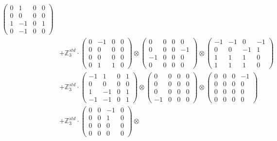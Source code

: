 \documentclass{article}
\begin{document}
{\begin{align}
            \begin{pmatrix} 0 & 1 & 0 & 0 \\ 0 & 0 & 0 & 0 \\ 1 & -1 & 0 & 1 \\ 0 & -1 & 0 & 0 \end{pmatrix} \\ 
        &+ \label{Rs16-Rc11-Solution-4-c25} \mathbb{Z}_3^{std} \cdot 
            \begin{pmatrix} 0 & -1 & 0 & 0 \\ 0 & 0 & 0 & 0 \\ 0 & 0 & 0 & 0 \\ 0 & 1 & 1 & 0 \end{pmatrix} \otimes 
            \begin{pmatrix} 0 & 0 & 0 & 0 \\ 0 & 0 & 0 & -1 \\ -1 & 0 & 0 & 0 \\ 0 & 0 & 0 & 0 \end{pmatrix} \otimes 
            \begin{pmatrix} -1 & -1 & 0 & -1 \\ 0 & 0 & -1 & 1 \\ 1 & 1 & 1 & 0 \\ 1 & 1 & 1 & 0 \end{pmatrix} \\ 
        &+ \label{Rs16-Rc11-Solution-4-c26} \mathbb{Z}_3^{std} \cdot 
            \begin{pmatrix} -1 & 1 & 0 & 1 \\ 0 & 0 & 0 & 0 \\ 1 & -1 & 0 & 1 \\ -1 & -1 & 0 & 1 \end{pmatrix} \otimes 
            \begin{pmatrix} 0 & 0 & 0 & 0 \\ 0 & 0 & 0 & 0 \\ 0 & 0 & 0 & 0 \\ -1 & 0 & 0 & 0 \end{pmatrix} \otimes 
            \begin{pmatrix} 0 & 0 & 0 & -1 \\ 0 & 0 & 0 & 0 \\ 0 & 0 & 0 & 0 \\ 0 & 0 & 0 & 0 \end{pmatrix} \\ 
        &+ \label{Rs16-Rc11-Solution-4-c27} \mathbb{Z}_3^{std} \cdot 
            \begin{pmatrix} 0 & 0 & -1 & 0 \\ 0 & 0 & 1 & 0 \\ 0 & 0 & 0 & 0 \\ 0 & 0 & 0 & 0 \end{pmatrix} \otimes 

\end{align}}
\end{document}

